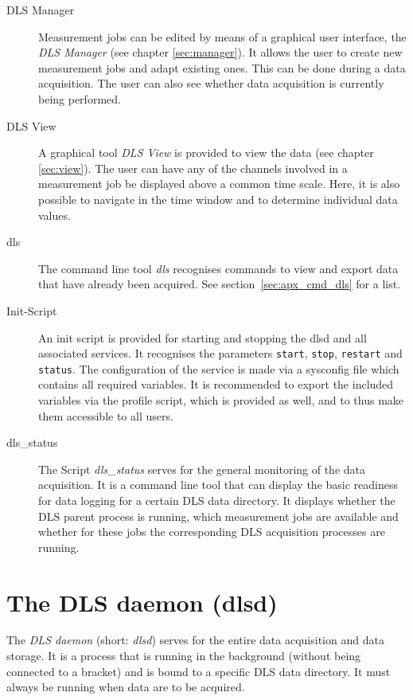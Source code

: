 \documentclass[a4paper,12pt,BCOR6mm,bibtotoc,idxtotoc]{scrbook}
\begin{document}
\begin{description} 
\item[DLS Manager] Measurement
  jobs can be edited by means of a graphical
  user interface, the \textit{DLS Manager} (see chapter \ref{sec:manager}). It allows the user to create new measurement jobs and adapt existing ones. This can be done during a data acquisition. The user can also see whether data acquisition is currently being performed. 
\item[DLS View] A graphical tool \textit{DLS View} is provided to view the data (see chapter \ref{sec:view}). The user can have any of the channels involved in a measurement job be displayed above a common time scale. Here, it is also possible to navigate in the time window and to determine individual data values.
\item[dls] The command line tool \textit{dls} recognises commands to view and export data that have already been acquired. See section~\ref{sec:apx_cmd_dls} for a list. 
\item[Init-Script] An init script is provided for starting and stopping the dlsd and all associated services. It recognises the parameters \texttt{start}, \texttt{stop}, \texttt{restart} and \texttt{status}. The configuration of the service is made via a sysconfig file which contains all required variables. It is recommended to export the included variables via the profile script, which is provided as well, and to thus make them accessible to all users. 
\item[dls\_status] The Script \textit{dls\_\-status} serves for the general monitoring of the data acquisition. It is a command line tool that can display the basic readiness for data logging for a certain DLS data directory. It displays whether the DLS parent process is running, which measurement jobs are available and whether for these jobs the corresponding DLS acquisition processes are running. \end{description}


\chapter{The DLS daemon (dlsd)} \label{sec:dlsd}

The \textit{DLS daemon} (short: \textit{dlsd}) serves for the entire data acquisition and data storage. It is a process that is running in the background (without being connected to a bracket) and is bound to a specific DLS data directory. It must always be running when data are to be acquired.
\end{document}
